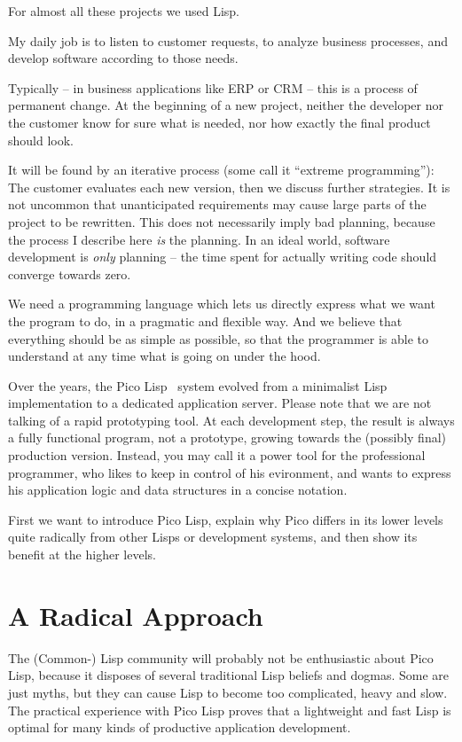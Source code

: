 For almost all these projects we used Lisp.

My daily job is to listen to customer requests, to analyze business processes,
and develop software according to those needs.

Typically -- in business applications like ERP or CRM -- this is a process of
permanent change. At the beginning of a new project, neither the developer nor
the customer know for sure what is needed, nor how exactly the final product
should look.

It will be found by an iterative process (some call it ``extreme programming''):
The customer evaluates each new version, then we discuss further strategies. It
is not uncommon that unanticipated requirements may cause large parts of the
project to be rewritten. This does not necessarily imply bad planning, because
the process I describe here \emph{is} the planning. In an ideal world, software
development is \emph{only} planning -- the time spent for actually writing code
should converge towards zero.

We need a programming language which lets us directly express what we want the
program to do, in a pragmatic and flexible way. And we believe that everything
should be as simple as possible, so that the programmer is able to understand at
any time what is going on under the hood.

Over the years, the Pico Lisp~\cite{down1} system
evolved from a minimalist Lisp implementation to a dedicated
application server. Please note that we are not talking of a rapid
prototyping tool. At each development step, the result is always a
fully functional program, not a prototype, growing towards the
(possibly final) production version. Instead, you may call it a power
tool for the professional programmer, who likes to keep in control of
his evironment, and wants to express his application logic and data
structures in a concise notation.

First we want to introduce Pico Lisp, explain why Pico differs in its lower
levels quite radically from other Lisps or development systems, and then show
its benefit at the higher levels.


\section{A Radical Approach}
\label{sec:rad-a-radical-approach}

The (Common-) Lisp community will probably not be enthusiastic about Pico Lisp,
because it disposes of several traditional Lisp beliefs and dogmas. Some are
just myths, but they can cause Lisp to become too complicated, heavy and slow.
The practical experience with Pico Lisp proves that a lightweight and fast Lisp
is optimal for many kinds of productive application development.


